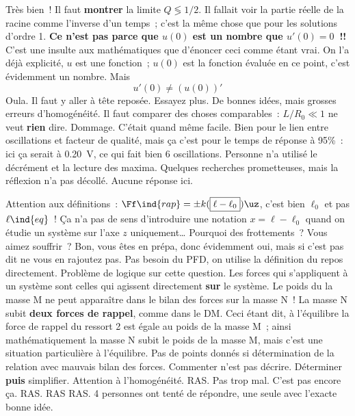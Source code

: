 \documentclass[a4paper, 10pt, final, garamond]{book}
\begin{document}
\setcounter{section}{0}
\begin{enumerate}
	 Très bien~!
	 Il faut \textbf{montrer} la limite $Q \lessgtr 1/2$.
	 Il fallait voir la partie réelle de la racine comme l'inverse d'un
	temps~; c'est la même chose que pour les solutions d'ordre 1.
	 \textbf{Ce n'est pas parce que $u(0)$ est un nombre que $u'(0) =
			0$~!!} C'est une {\Large insulte aux mathématiques} que d'énoncer ceci
	comme étant vrai. On l'a déjà explicité, $u$ est une fonction~; $u(0)$
	est la fonction évaluée en ce point, c'est évidemment un nombre. Mais
		{\Large
			\[
				\boxed{u'(0) \neq (u(0))'}
			\]
		}
	 Oula. Il faut y aller à tête reposée. Essayez plus.
	 De bonnes idées, mais grosses erreurs d'homogénéité. Il faut
	comparer des choses comparables~: $L/R_0 \ll 1$ ne veut \textbf{rien} dire.
	 Dommage.
	 C'était quand même facile.
	 Bien pour le lien entre oscillations et facteur de qualité, mais ça
	c'est pour le temps de réponse à 95\%~: ici ça serait à \SI{0.20}{V}, ce qui
	fait bien 6 oscillations. Personne n'a utilisé le décrément et la lecture des
	maxima.
	 Quelques recherches prometteuses, mais la réflexion n'a pas décollé.
	 Aucune réponse ici.
\end{enumerate}

\begin{enumerate}
	 Attention aux définitions~: $\Ff\ind{rap} = \pm k
		(\boxed{\ell-\ell_0})\uz$, c'est bien $\ell_0$ et pas $\ell\ind{eq}$~!
	Ça n'a pas de sens d'introduire une notation $x = \ell - \ell_0$ quand on
	étudie un système sur l'axe $z$ uniquement…
	Pourquoi des frottements~? Vous aimez souffrir~? Bon, vous êtes en prépa, donc
	évidemment oui, mais si c'est pas dit ne vous en rajoutez pas.
	 Pas besoin du PFD, on utilise la définition du repos directement.
	 Problème de logique sur cette question. Les forces qui s'appliquent
	à un système sont celles qui agissent directement \textbf{sur} le système. Le
	poids du la masse M ne peut apparaître dans le bilan des forces sur la masse
	N~! La masse N subit \textbf{deux forces de rappel}, comme dans le DM.
	\smallbreak
	Ceci étant dit, à l'équilibre la force de rappel du ressort 2 est égale au
	poids de la masse M~; ainsi mathématiquement la masse N subit le poids de la
	masse M, mais c'est une situation particulière à l'équilibre.
	 Pas de points donnés si détermination de la relation avec mauvais
	bilan des forces.
	 Commenter n'est pas décrire.
	 Déterminer \textbf{puis} simplifier.
	 Attention à l'homogénéité.
	 RAS.
	 Pas trop mal.
	 C'est pas encore ça.
	 RAS.
	 RAS
	 RAS. 4 personnes ont tenté de répondre, une seule avec l'exacte
	bonne idée.
\end{enumerate}
\end{document}
